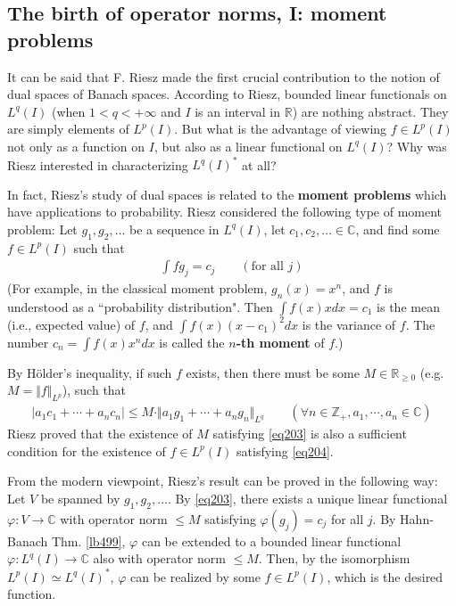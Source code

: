 \documentclass[12pt,b5paper,notitlepage]{article}
\theoremstyle{definition}
\theoremstyle{plain}
\newcommand{\Cbb}{\mathbb C}
\newcommand{\Zbb}{\mathbb Z}
\newcommand{\Rbb}{\mathbb R}
\numberwithin{equation}{section}
\begin{document}
\subsection{The birth of operator norms, I: moment problems}\label{lb543}

It can be said that F. Riesz made the first crucial contribution to the notion of dual spaces of Banach spaces. According to Riesz, bounded linear functionals on $L^q(I)$ (when $1<q<+\infty$ and $I$ is an interval in $\Rbb$) are nothing abstract. They are simply elements of $L^p(I)$. But what is the advantage of viewing $f\in L^p(I)$ not only as a function on $I$, but also as a linear functional on $L^q(I)$? Why was Riesz interested in characterizing $L^q(I)^*$ at all?


In fact, Riesz's study of dual spaces is related to the \textbf{moment problems} which have applications to probability. Riesz considered the following type of moment problem: Let $g_1,g_2,\dots$ be a sequence in $L^q(I)$, let $c_1,c_2,\dots\in\Cbb$, and find some $f\in L^p(I)$ such that
\begin{align}
\int fg_j=c_j\qquad(\text{for all } j) \label{eq204}
\end{align}
(For example, in the classical moment problem, $g_n(x)=x^n$, and $f$ is understood as a ``probability distribution". Then $\int f(x)xdx=c_1$ is the mean (i.e., expected value) of $f$, and $\int f(x)(x-c_1)^2dx$ is the variance of $f$. The number $c_n=\int f(x)x^ndx$ is called the \textbf{$n$-th moment} of $f$.)


By H\"older's inequality, if such $f$ exists, then there must be some $M\in\Rbb_{\geq0}$ (e.g. $M=\Vert f\Vert_{L^p}$), such that 
\begin{align}\label{eq203}
|a_1c_1+\cdots+a_nc_n|\leq M\cdot \Vert a_1g_1+\cdots+a_ng_n\Vert_{L^q}\qquad(\forall n\in\Zbb_+,a_1,\cdots,a_n\in\Cbb)
\end{align}
Riesz proved that the existence of $M$ satisfying \eqref{eq203} is also a sufficient condition for the existence of $f\in L^p(I)$ satisfying \eqref{eq204}. 

From the modern viewpoint, Riesz's result can be proved in the following way: Let $V$ be spanned by $g_1,g_2,\dots$. By \eqref{eq203}, there exists a unique linear functional $\varphi:V\rightarrow\Cbb$ with operator norm $\leq M$ satisfying $\varphi(g_j)=c_j$ for all $j$. By Hahn-Banach Thm. \ref{lb499}, $\varphi$ can be extended to a bounded linear functional $\varphi:L^q(I)\rightarrow\Cbb$ also with operator norm $\leq M$. Then, by the isomorphism $L^p(I)\simeq L^q(I)^*$, $\varphi$ can be realized by some $f\in L^p(I)$, which is the desired function.
\end{document}
